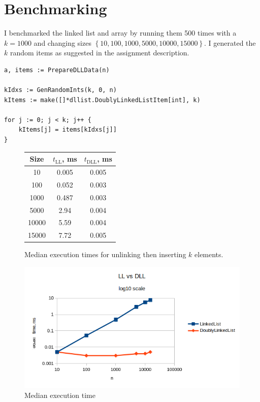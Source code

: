 \documentclass[a4paper,11pt]{article}
\begin{document}
    \section*{Benchmarking}

    I benchmarked the linked list and array by running them 500 times with a $k=1000$ and changing sizes $\left\{10, 100, 1000, 5000, 10000, 15000\right\}$. I generated the $k$ random items as suggested in the assignment description.

    \begin{verbatim}
a, items := PrepareDLLData(n)

kIdxs := GenRandomInts(k, 0, n)
kItems := make([]*dllist.DoublyLinkedListItem[int], k)

for j := 0; j < k; j++ {
    kItems[j] = items[kIdxs[j]]
}
    \end{verbatim}

    \begin{figure}[H]
        \centering
        
        \begin{tabular}{c|c|c}
            Size & $t_\text{LL}$, ms & $t_\text{DLL}$, ms \\
            \hline
            \hline
            10 & 0.005 & 0.005 \\
            \hline
            100 & 0.052 & 0.003 \\
            \hline
            1000 & 0.487 & 0.003 \\
            \hline
            5000 & 2.94 & 0.004 \\
            \hline
            10000 & 5.59 & 0.004 \\
            \hline
            15000 & 7.72 & 0.005 \\
        \end{tabular}

        \caption{Median execution times for unlinking then inserting $k$ elements.}
    \end{figure}

    \begin{figure}[H]
        \centering
        \includegraphics[width=\textwidth]{b3.png}
        \caption{Median execution time}
        \label{fig:b3}
    \end{figure}
\end{document}
